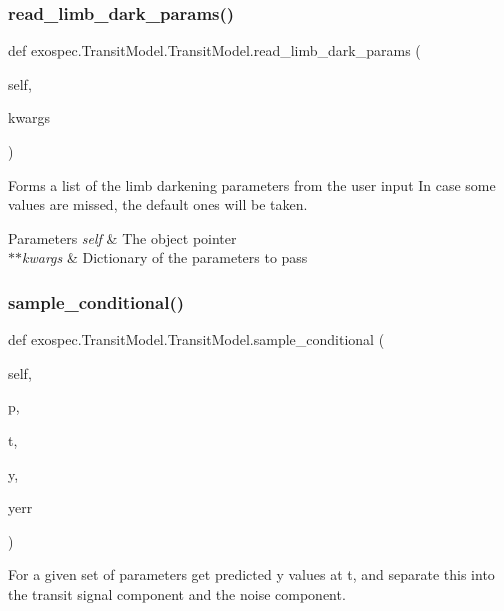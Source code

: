 \subsubsection{\texorpdfstring{read\+\_\+limb\+\_\+dark\+\_\+params()}{read\_limb\_dark\_params()}}
{\footnotesize\ttfamily def exospec.\+Transit\+Model.\+Transit\+Model.\+read\+\_\+limb\+\_\+dark\+\_\+params (\begin{DoxyParamCaption}\item[{}]{self,  }\item[{}]{kwargs }\end{DoxyParamCaption})}



Forms a list of the limb darkening parameters from the user input In case some values are missed, the default ones will be taken. 


\begin{DoxyParams}{Parameters}
{\em self} & The object pointer \\
\hline
{\em $\ast$$\ast$kwargs} & Dictionary of the parameters to pass \\
\hline
\end{DoxyParams}
\mbox{\label{classexospec_1_1_transit_model_1_1_transit_model_a3a01d6ec61e2e9e95b6d2fd389c0d577}} 
\subsubsection{\texorpdfstring{sample\+\_\+conditional()}{sample\_conditional()}}
{\footnotesize\ttfamily def exospec.\+Transit\+Model.\+Transit\+Model.\+sample\+\_\+conditional (\begin{DoxyParamCaption}\item[{}]{self,  }\item[{}]{p,  }\item[{}]{t,  }\item[{}]{y,  }\item[{}]{yerr }\end{DoxyParamCaption})}



For a given set of parameters get predicted y values at t, and separate this into the transit signal component and the noise component. 


